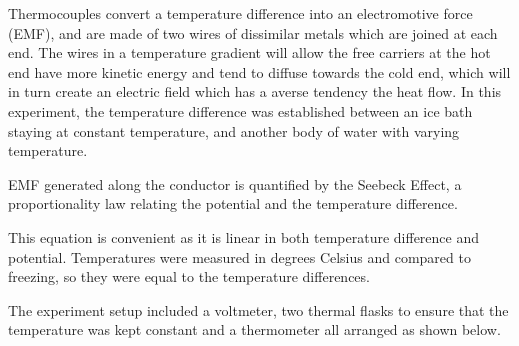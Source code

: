 \begin{paper}
	

	Thermocouples convert a temperature difference into an electromotive force (EMF), and are made of two wires of dissimilar metals which are joined at each end. The wires in a temperature gradient will allow the free carriers at the hot end have more kinetic energy and tend to diffuse towards the cold end, which will in turn create an electric field which has a averse tendency the heat flow. In this experiment, the temperature difference was established between an ice bath staying at constant temperature, and another body of water with varying temperature. 
	
	EMF generated along the conductor is quantified by the Seebeck Effect, a proportionality law relating the potential and the temperature difference.
	\begin{paperwhere}
	\end{paperwhere}
	
	This equation is convenient as it is linear in both temperature difference and potential.
	Temperatures were measured in degrees Celsius and compared to freezing, so they were equal to the temperature differences.
	
	The experiment setup included a voltmeter, two thermal flasks to ensure that the temperature was kept constant and a thermometer all arranged as shown below.
	
	

\end{paper}
